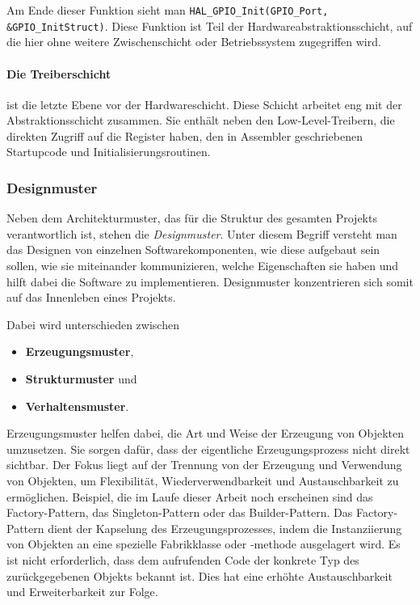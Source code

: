 Am Ende dieser Funktion sieht man \texttt{HAL\_GPIO\_Init(GPIO\_Port, \&GPIO\_InitStruct)}.
Diese Funktion ist Teil der Hardwareabstraktionsschicht, auf die hier ohne weitere Zwischenschicht oder Betriebssystem zugegriffen wird.

\paragraph{Die Treiberschicht} 
ist die letzte Ebene vor der Hardwareschicht.
Diese Schicht arbeitet eng mit der Abstraktionsschicht zusammen.
Sie enthält neben den Low-Level-Treibern, die direkten Zugriff auf die Register haben, den in Assembler geschriebenen Startupcode und Initialisierungsroutinen.


\subsubsection{Designmuster} \label{chap3_2_1_designmuster}
Neben dem Architekturmuster, das für die Struktur des gesamten Projekts verantwortlich ist, stehen die \emph{Designmuster}.
Unter diesem Begriff versteht man das Designen von einzelnen Softwarekomponenten, wie diese aufgebaut sein sollen, wie sie miteinander kommunizieren, welche Eigenschaften sie haben und hilft dabei die Software zu implementieren.
Designmuster konzentrieren sich somit auf das Innenleben eines Projekts.\cite{gfg_DesignVsArchitecture}

Dabei wird unterschieden zwischen
\begin{itemize}
	\item \textbf{Erzeugungsmuster},
	\item \textbf{Strukturmuster} und
	\item \textbf{Verhaltensmuster}.
\end{itemize}

Erzeugungsmuster helfen dabei, die Art und Weise der Erzeugung von Objekten umzusetzen.
Sie sorgen dafür, dass der eigentliche Erzeugungsprozess nicht direkt sichtbar.
Der Fokus liegt auf der Trennung von der Erzeugung und Verwendung von Objekten, um Flexibilität, Wiederverwendbarkeit und Austauschbarkeit zu ermöglichen.
Beispiel, die im Laufe dieser Arbeit noch erscheinen sind das Factory-Pattern, das Singleton-Pattern oder das Builder-Pattern.
Das Factory-Pattern dient der Kapselung des Erzeugungsprozesses, indem die Instanziierung von Objekten an eine spezielle Fabrikklasse oder -methode ausgelagert wird. 
Es ist nicht erforderlich, dass dem aufrufenden Code der konkrete Typ des zurückgegebenen Objekts bekannt ist. 
Dies hat eine erhöhte Austauschbarkeit und Erweiterbarkeit zur Folge.

